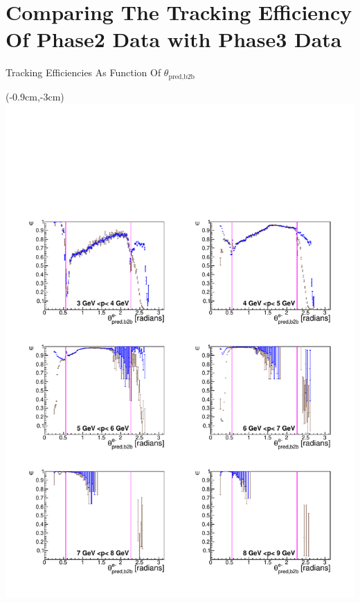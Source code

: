 \documentclass[8pt]{beamer}
\begin{document}
\section{Comparing The Tracking Efficiency Of Phase2 Data with Phase3 Data}






\begin{frame}{Tracking Efficiencies As Function Of $\theta_{\textrm{pred,b2b}}$}



	\begin{textblock*}{6.5cm}(-0.9cm,-3cm)
	\includegraphics[width=\textwidth]{VPlots/Comp/cMThetaem_Data}
\end{textblock*}


\end{frame}
\end{document}
